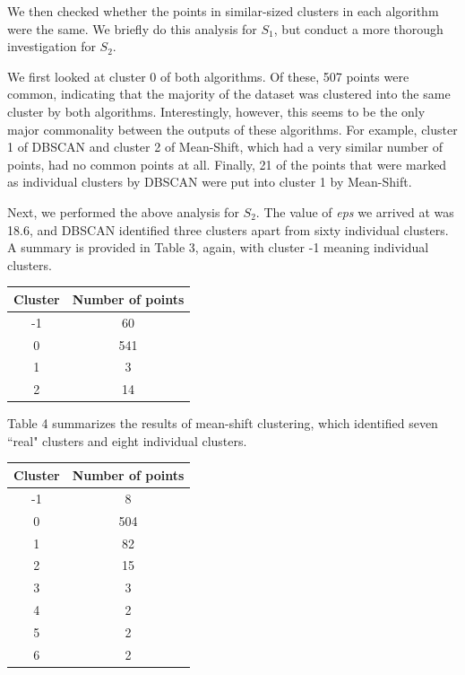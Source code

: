 \documentclass[12pt,a4paper,twocolumn]{article}
\begin{document}
We then checked whether the points in similar-sized clusters in each algorithm were the same. We briefly do this analysis for $S_1$, but conduct a more thorough investigation for $S_2$.

We first looked at cluster 0 of both algorithms. Of these, 507 points were common, indicating that the majority of the dataset was clustered into the same cluster by both algorithms. Interestingly, however, this seems to be the only major commonality between the outputs of these algorithms. For example, cluster 1 of DBSCAN and cluster 2 of Mean-Shift, which had a very similar number of points, had no common points at all. Finally, 21 of the points that were marked as individual clusters by DBSCAN were put into cluster 1 by Mean-Shift.

Next, we performed the above analysis for $S_2$. The value of \textit{eps} we arrived at was 18.6, and DBSCAN identified three clusters apart from sixty individual clusters. A summary is provided in Table 3, again, with cluster -1 meaning individual clusters.\\

\begin{tabular}{|c|c|}
\hline 
\textbf{Cluster} & \textbf{Number of points} \\ 
\hline 
-1 & 60 \\ 
\hline 
0 & 541 \\ 
\hline 
1 & 3 \\ 
\hline 
2 & 14 \\ 
\hline 
\end{tabular} 
\begingroup
{}
\endgroup
\hfill\break

Table 4 summarizes the results of mean-shift clustering, which identified seven ``real" clusters and eight individual clusters.\\

\begin{tabular}{|c|c|}
\hline 
\textbf{Cluster} & \textbf{Number of points} \\ 
\hline 
-1 & 8 \\ 
\hline 
0 & 504 \\ 
\hline 
1 & 82 \\ 
\hline 
2 & 15 \\ 
\hline 
3 & 3 \\ 
\hline 
4 & 2 \\ 
\hline 
5 & 2 \\ 
\hline 
6 & 2 \\ 
\hline 
\end{tabular} 
\begingroup
{}
\endgroup
\hfill\break
\end{document}
